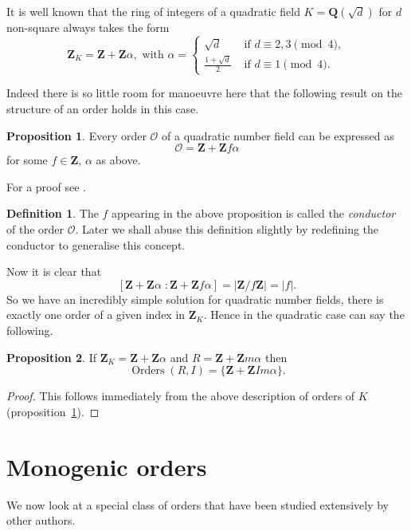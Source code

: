 \documentclass[a4paper,abstracton]{scrreprt}
\theoremstyle{definition}
\newtheorem{prop}{Proposition}
\newtheorem{defn}{Definition}
\newcommand{\QQ}{\mathbf{Q}}
\newcommand{\ZZ}{\mathbf{Z}}
\renewcommand{\O}{\mathcal{O}}
\DeclareMathOperator{\Orders}{Orders}
\begin{document}
It is well known \cite{lang} that the ring of integers of a quadratic field $K = \QQ(\sqrt{d})$ for $d$ non-square always takes the form
\[\ZZ_K = \ZZ + \ZZ\alpha,\text{ with } \alpha =\begin{cases}
\sqrt{d}&\text{ if $d\equiv 2,3\pmod{4}$},\\
\frac{1+\sqrt{d}}{2}&\text{ if $d\equiv 1\pmod{4}$}.
\end{cases}\]

Indeed there is so little room for manoeuvre here that the following result on the structure of an order holds in this case.

\begin{prop}
\label{prop:quadord}
Every order $\O$ of a quadratic number field can be expressed as
\[\O = \ZZ + \ZZ f\alpha\]
for some $f\in \ZZ$, $\alpha$ as above.
\end{prop}

For a proof see \cite[pp. 133--134]{cox}.

\begin{defn}
The $f$ appearing in the above proposition is called the \emph{conductor} of the order $\O$.
Later we shall abuse this definition slightly by redefining the conductor to generalise this concept.
\end{defn}

Now it is clear that
\[
[\ZZ + \ZZ\alpha\; \colon \ZZ + \ZZ f \alpha] = |\ZZ/f\ZZ| = |f|.
\]
So we have an incredibly simple solution for quadratic number fields, there is exactly one order of a given index in $\ZZ_K$.
Hence in the quadratic case can say the following.

\begin{prop}
If $\ZZ_K = \ZZ + \ZZ\alpha$ and $R = \ZZ + \ZZ m\alpha$ then
\[
\Orders(R, I) = \{\ZZ + \ZZ Im\alpha\}.
\]
\end{prop}
\begin{proof}
This follows immediately from the above description of orders of $K$ (proposition~\ref{prop:quadord}).
\end{proof}


\section{Monogenic orders}

We now look at a special class of orders that have been studied extensively by other authors.
\end{document}
